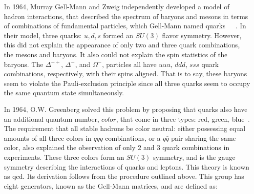 \par In 1964, Murray Gell-Mann and Zweig independently developed a model
of hadron interactions, that described the spectrum of baryons and
mesons in terms of combinations of fundamental particles, which
Gell-Mann named
quarks~\cite{th:GellMann_QuarkModel}~\cite{th:Zweig_QuarkModel1}~\cite{th:Zweig_QuarkModel2}.
In their model, three quarks: $u, d, s$ formed an $SU(3)$ flavor
symmetry.  However, this did not explain the appearance of only two
and three quark combinations, the mesons and baryons.  It also could
not explain the spin statistics of the baryons.  The $\Delta^{++}$,
$\Delta^{-}$, and $\Omega^{-}$, particles all have $uuu$, $ddd$, $sss$
quark combinations, respectively, with their spins aligned.  That is
to say, these baryons seem to violate the Pauli-exclusion principle
since all three quarks seem to occupy the same quantum state
simultaneously.   

\par  In 1964, O.W. Greenberg solved this problem by proposing that quarks also have
an additional quantum number, $color$, that come in three types: red,
green, blue~\cite{th:Greenberg_color}.  The requirement that all
stable hadrons be color neutral: either possessing equal amounts of
all three colors in $qqq$ combinations, or a $q\bar{q}$ pair sharing the
same color, also explained the observation of only 2 and 3 quark
combinations in experiments.  These three colors form an
$SU(3)$ symmetry, and is the gauge symmetry describing the
interactions of quarks and leptons.  This theory is known as
\acrfull{qcd}.  Its derivation follows from the procedure outlined
above.  This group has eight generators, known as the Gell-Mann
matrices, and are defined as: 

